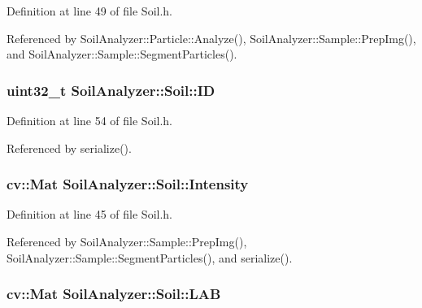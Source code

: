 Definition at line 49 of file Soil.\+h.



Referenced by Soil\+Analyzer\+::\+Particle\+::\+Analyze(), Soil\+Analyzer\+::\+Sample\+::\+Prep\+Img(), and Soil\+Analyzer\+::\+Sample\+::\+Segment\+Particles().

\hypertarget{class_soil_analyzer_1_1_soil_a0011c3cd2a504e34c5962cbf72e397da}{}
\subsubsection[{I\+D}]{\setlength{\rightskip}{0pt plus 5cm}uint32\+\_\+t Soil\+Analyzer\+::\+Soil\+::\+I\+D}\label{class_soil_analyzer_1_1_soil_a0011c3cd2a504e34c5962cbf72e397da}


Definition at line 54 of file Soil.\+h.



Referenced by serialize().

\hypertarget{class_soil_analyzer_1_1_soil_a6f56200f2722df5b849d8cddd094c852}{}
\subsubsection[{Intensity}]{\setlength{\rightskip}{0pt plus 5cm}cv\+::\+Mat Soil\+Analyzer\+::\+Soil\+::\+Intensity}\label{class_soil_analyzer_1_1_soil_a6f56200f2722df5b849d8cddd094c852}


Definition at line 45 of file Soil.\+h.



Referenced by Soil\+Analyzer\+::\+Sample\+::\+Prep\+Img(), Soil\+Analyzer\+::\+Sample\+::\+Segment\+Particles(), and serialize().

\hypertarget{class_soil_analyzer_1_1_soil_a59ee773ff73380a12b1c2af3b86f6638}{}
\subsubsection[{L\+A\+B}]{\setlength{\rightskip}{0pt plus 5cm}cv\+::\+Mat Soil\+Analyzer\+::\+Soil\+::\+L\+A\+B}\label{class_soil_analyzer_1_1_soil_a59ee773ff73380a12b1c2af3b86f6638}


